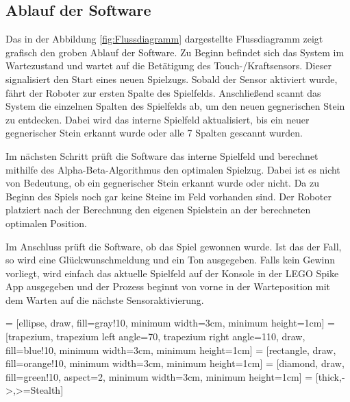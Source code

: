 \subsection{Ablauf der Software}
Das in der Abbildung \ref{fig:Flussdiagramm} dargestellte Flussdiagramm zeigt grafisch den groben Ablauf der Software. \newline
Zu Beginn befindet sich das System im Wartezustand und wartet auf die Betätigung des Touch-/Kraftsensors. Dieser signalisiert den Start eines neuen Spielzugs. Sobald der Sensor aktiviert wurde, fährt der Roboter zur ersten Spalte des Spielfelds.
Anschließend scannt das System die einzelnen Spalten des Spielfelds ab, um den neuen gegnerischen Stein zu entdecken. Dabei wird das interne Spielfeld aktualisiert, bis ein neuer gegnerischer Stein erkannt wurde oder alle 7 Spalten gescannt wurden.

Im nächsten Schritt prüft die Software das interne Spielfeld und berechnet mithilfe des Alpha-Beta-Algorithmus den optimalen Spielzug.
Dabei ist es nicht von Bedeutung, ob ein gegnerischer Stein erkannt wurde oder nicht. Da zu Beginn des Spiels noch gar keine Steine im Feld vorhanden sind.
Der Roboter platziert nach der Berechnung den eigenen Spielstein an der berechneten optimalen Position.

Im Anschluss prüft die Software, ob das Spiel gewonnen wurde. Ist das der Fall, so wird eine Glückwunschmeldung und ein Ton ausgegeben. Falls kein Gewinn vorliegt, wird einfach das aktuelle Spielfeld auf der Konsole in der LEGO Spike App ausgegeben und der Prozess beginnt von vorne in der Warteposition mit dem Warten auf die nächste Sensoraktivierung. 




 = [ellipse, draw, fill=gray!10, minimum width=3cm, minimum height=1cm]
 = [trapezium, trapezium left angle=70, trapezium right angle=110, draw, fill=blue!10, minimum width=3cm, minimum height=1cm]
 = [rectangle, draw, fill=orange!10, minimum width=3cm, minimum height=1cm]
 = [diamond, draw, fill=green!10, aspect=2, minimum width=3cm, minimum height=1cm]
 = [thick,->,>=Stealth]


